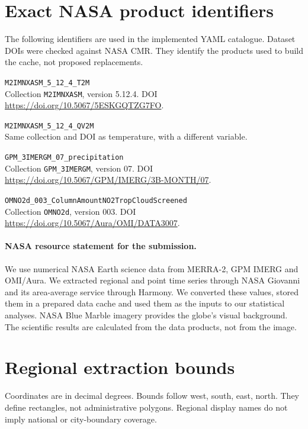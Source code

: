 \documentclass[10pt,a4paper,twocolumn]{article}
\newcommand{\code}[1]{\texttt{#1}}
\begin{document}
\clearpage
\onecolumn
\appendix
\section{Exact NASA product identifiers}
\label{app:products}
The following identifiers are used in the implemented YAML catalogue. Dataset DOIs were checked against NASA CMR. They identify the products used to build the cache, not proposed replacements.
\begin{description}[style=nextline]
\item[Air temperature] \code{M2IMNXASM\_5\_12\_4\_T2M}\\
Collection \code{M2IMNXASM}, version 5.12.4. DOI \url{https://doi.org/10.5067/5ESKGQTZG7FO}.
\item[Specific humidity] \code{M2IMNXASM\_5\_12\_4\_QV2M}\\
Same collection and DOI as temperature, with a different variable.
\item[Precipitation] \code{GPM\_3IMERGM\_07\_precipitation}\\
Collection \code{GPM\_3IMERGM}, version 07. DOI \url{https://doi.org/10.5067/GPM/IMERG/3B-MONTH/07}.
\item[Tropospheric nitrogen dioxide] \code{OMNO2d\_003\_ColumnAmountNO2TropCloudScreened}\\
Collection \code{OMNO2d}, version 003. DOI \url{https://doi.org/10.5067/Aura/OMI/DATA3007}.
\end{description}
\paragraph{NASA resource statement for the submission.}
We use numerical NASA Earth science data from MERRA-2, GPM IMERG and OMI/Aura. We extracted regional and point time series through NASA Giovanni and its area-average service through Harmony. We converted these values, stored them in a prepared data cache and used them as the inputs to our statistical analyses. NASA Blue Marble imagery provides the globe's visual background. The scientific results are calculated from the data products, not from the image.

\section{Regional extraction bounds}
\label{app:regions}
Coordinates are in decimal degrees. Bounds follow west, south, east, north. They define rectangles, not administrative polygons. Regional display names do not imply national or city-boundary coverage.

\end{document}
